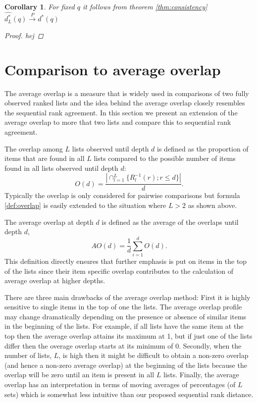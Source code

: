 \documentclass[12pt,a4paper]{article}
\theoremstyle{plain}
\newtheorem{corollary}{Corollary}
\begin{document}
\begin{corollary}
For fixed $q$ it follows from theorem \ref{thm:consistency}
  $\widehat{d^\ast_L}(q) \overset{P}{\longrightarrow} d^\ast(q)$
\begin{proof}
 hej
\end{proof}
\end{corollary}



\section{Comparison to average overlap}

The average overlap is a measure that is widely used in comparisons of
two fully observed ranked lists \citep{Fagin2003,Webber2010} and the
idea behind the average overlap closely resembles the sequential rank
agreement. In this section we present an extension of the average
overlap to more that two lists and compare this to sequential rank
agreement.

The overlap among $L$ lists observed until depth $d$ is defined as the
proportion of items that are found in all $L$ lists compared to the
possible number of items found in all lists observed until depth $d$:
\begin{equation}
  O(d) = \frac{| \cap_{l=1}^L \{R_l^{-1}(r); r\leq d \} |}{d}. \label{def:overlap}
\end{equation}
Typically the overlap is only considered for pairwise comparisons
\citep{Bar-Ilan2006,Boulesteix2009} but formula \eqref{def:overlap}
is easily extended to the situation where $L>2$ as shown above.

The average overlap at depth $d$ is defined as the average of the
overlaps until depth $d$,
\begin{equation}
AO(d) = \frac1d\sum_{i=1}^d O(d).
\end{equation}
This definition directly ensures that further emphasis is put on items
in the top of the lists since their item specific overlap contributes
to the calculation of average overlap at higher depths.

There are three main drawbacks of the average overlap method: First it
is highly sensitive to single items in the top of one the lists.  The
average overlap profile may change dramatically depending on the
presence or absence of similar items in the beginning of the
lists. For example, if all lists have the same item at the top then
the average overlap attains its maximum at 1, but if just one of the
lists differ then the overage overlap starts at its minimum of
0. Secondly, when the number of lists, $L$, is high then it might be
difficult to obtain a non-zero overlap (and hence a non-zero average
overlap) at the beginning of the lists because the overlap will be
zero until an item is present in all $L$ lists. Finally, the average
overlap has an interpretation in terms of moving averages of
percentages (of $L$ sets) which is somewhat less intuitive than our
proposed sequential rank distance.
\end{document}
